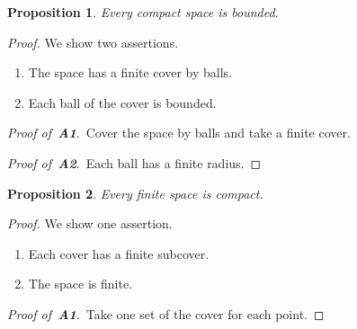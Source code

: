 \documentclass{article}
\newtheorem{proposition}{Proposition}
\begin{document}
\begin{proposition} Every compact space is bounded. \end{proposition}
\begin{proof} We show two assertions.
\begin{enumerate}
\item[{\bf A1.}\,] The space has a finite cover by balls.
\item[{\bf A2.}\,] Each ball of the cover is bounded.
\end{enumerate}

{\it Proof of \,{\bf A1}}.\, Cover the space by balls and take a finite cover.

{\it Proof of \,{\bf A2}}.\, Each ball has a finite radius.
\end{proof}
\begin{proposition} Every finite space is compact. \end{proposition}
\begin{proof} We show one assertion.
\begin{enumerate}
\item[{\bf A1.}\,] Each cover has a finite subcover.
\item[{\bf B1.}\,] The space is finite.
\end{enumerate}

{\it Proof of \,{\bf A1}}.\, Take one set of the cover for each point.
\end{proof}
\end{document}
